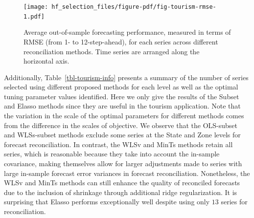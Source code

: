 \documentclass[11pt,a4paper,]{article}
\begin{document}
\begin{figure}

{\centering \texttt{[image: hf\_selection\_files/figure-pdf/fig-tourism-rmse-1.pdf]}

}

\caption{\label{fig-tourism-rmse}Average out-of-sample forecasting
performance, measured in terms of RMSE (from 1- to 12-step-ahead), for
each series across different reconciliation methods. Time series are
arranged along the horizontal axis.}

\end{figure}

Additionally, Table~\ref{tbl-tourism-info} presents a summary of the
number of series selected using different proposed methods for each
level as well as the optimal tuning parameter values identified. Here we
only give the results of the Subset and Elasso methods since they are
useful in the tourism application. Note that the variation in the scale
of the optimal parameters for different methods comes from the
difference in the scales of objective. We observe that the OLS-subset
and WLSs-subset methods exclude some series at the State and Zone levels
for forecast reconciliation. In contrast, the WLSv and MinTs methods
retain all series, which is reasonable because they take into account
the in-sample covariance, making themselves allow for larger adjustments
made to series with large in-sample forecast error variances in forecast
reconciliation. Nonetheless, the WLSv and MinTs methods can still
enhance the quality of reconciled forecasts due to the inclusion of
shrinkage through additional ridge regularization. It is surprising that
Elasso performs exceptionally well despite using only \(13\) series for
reconciliation.

\hypertarget{tbl-tourism-info}{}
\begin{table}[!h]
\caption{\label{tbl-tourism-info}Number of time series selected using different proposed methods and the
optimal parameter values identified in the tourism application,
considering a single test set (from January 2017 to December 2017). }\tabularnewline

\centering
{}
\end{table}
\end{document}
